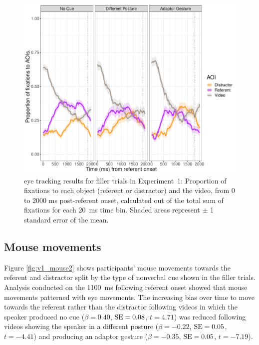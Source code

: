 \documentclass[a4paper,man,natbib]{apa6}
\newcommand{\resultsLM}[3]{$\beta = #1$, $\textnormal{SE} = #2$, $t #3$}
\begin{document}

\begin{figure}[Ht]
  \centering
	\includegraphics[width=\linewidth]{./img/e7_fixations_filler.pdf}
  \caption{eye tracking results for filler trials in Experiment~1: Proportion of fixations to each object (referent or distractor) and the video, from 0 to 2000 ms post-referent onset, calculated out of the total sum of fixations for each 20~ms time bin. Shaded areas represent $\pm$ 1 standard error of the mean.}
  \label{fig:v1_eye2}
\end{figure}

\subsection{Mouse movements}
Figure \ref{fig:v1_mouse2} shows participants' mouse movements towards the referent and distractor split by the type of nonverbal cue shown in the filler trials. 
Analysis conducted on the 1100~ms following referent onset showed that mouse movements patterned with eye movements.
The increasing bias over time to move towards the referent rather than the distractor following videos in which the speaker produced no cue (\resultsLM{0.40}{0.08}{=4.71}) was reduced following videos showing the speaker in a different posture (\resultsLM{-0.22}{0.05}{=-4.41}) and producing an adaptor gesture (\resultsLM{-0.35}{0.05}{=-7.19}).
\end{document}
